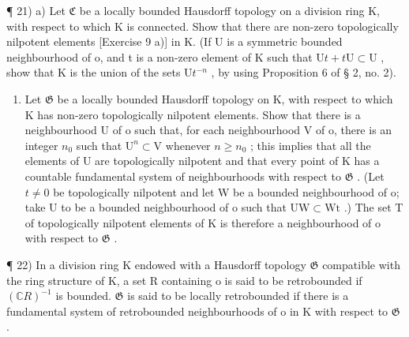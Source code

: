 ¶ 21) a) Let \(\mathfrak{C}\) be a locally bounded Hausdorff topology on a division ring K, with respect to which K is connected. Show that there are non-zero topologically nilpotent elements {[}Exercise 9 a){]} in K. (If U is a symmetric bounded neighbourhood of o, and t is a non-zero element of K such that \(\mathrm{U}t + t\mathrm{U} \subset \mathrm{U}\) , show that K is the union of the sets \(\mathrm{U}t^{-n}\) , by using Proposition 6 of § 2, no. 2).

\begin{enumerate}
\def\labelenumi{\alph{enumi})}
\setcounter{enumi}{1}
\tightlist
\item
  Let \(\mathfrak{G}\) be a locally bounded Hausdorff topology on K, with respect to which K has non-zero topologically nilpotent elements. Show that there is a neighbourhood U of o such that, for each neighbourhood V of o, there is an integer \(n_0\) such that \(\mathrm{U}^n\subset \mathrm{V}\) whenever \(n\geqslant n_0\) ; this implies that all the elements of U are topologically nilpotent and that every point of K has a countable fundamental system of neighbourhoods with respect to \(\mathfrak{G}\) . (Let \(t\neq 0\) be topologically nilpotent and let W be a bounded neighbourhood of o; take U to be a bounded neighbourhood of o such that \(\mathrm{UW}\subset \mathrm{Wt}\) .) The set T of topologically nilpotent elements of K is therefore a neighbourhood of o with respect to \(\mathfrak{G}\) .
\end{enumerate}

¶ 22) In a division ring K endowed with a Hausdorff topology \(\mathfrak{G}\) compatible with the ring structure of K, a set R containing o is said to be retrobounded if \((\mathbb{C}R)^{-1}\) is bounded. \(\mathfrak{G}\) is said to be locally retrobounded if there is a fundamental system of retrobounded neighbourhoods of o in K with respect to \(\mathfrak{G}\) .

